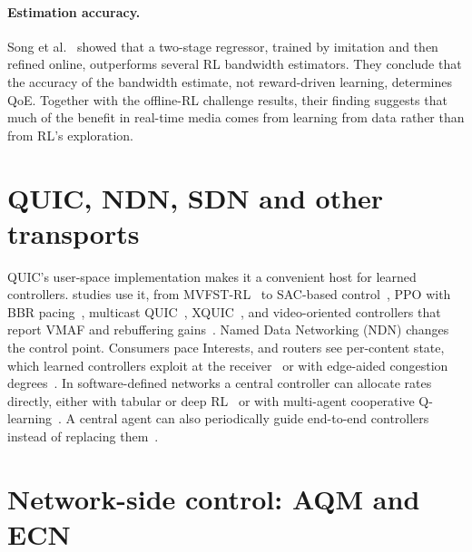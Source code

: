 \paragraph{Estimation accuracy.} Song et al.~\cite{song2025debunking} showed that a two-stage regressor, trained by imitation and then refined online, outperforms several RL bandwidth estimators. They conclude that the accuracy of the bandwidth estimate, not reward-driven learning, determines QoE. Together with the offline-RL challenge results, their finding suggests that much of the benefit in real-time media comes from learning from data rather than from RL's exploration.

\section{QUIC, NDN, SDN and other transports}
\label{sec:other-transports}

QUIC's user-space implementation makes it a convenient host for learned controllers. \nTopicQUIC{} studies use it, from MVFST-RL~\cite{sivakumar2019mvfst} to SAC-based control~\cite{blokhin2024deep}, PPO with BBR pacing~\cite{zhang2023pbq}, multicast QUIC~\cite{chen2023congestion}, XQUIC~\cite{yu2025dnccq}, and video-oriented controllers that report VMAF and rebuffering gains~\cite{sidhu2026pluggable,suarez2025pulsequic}. Named Data Networking (NDN) changes the control point. Consumers pace Interests, and routers see per-content state, which learned controllers exploit at the receiver~\cite{lan2019deep,zheng2024receiver} or with edge-aided congestion degrees~\cite{yang2022ieacc}. In software-defined networks a central controller can allocate rates directly, either with tabular or deep RL~\cite{zhang2021research,lei2020congestion,boussaoud2025dual} or with multi-agent cooperative Q-learning~\cite{boussaoud2023multi}. A central agent can also periodically guide end-to-end controllers instead of replacing them~\cite{konig2026augmenting}.

\section{Network-side control: AQM and ECN}
\label{sec:aqm}

